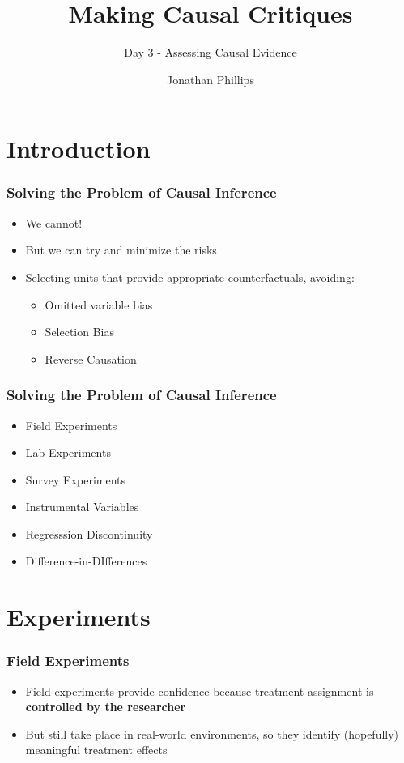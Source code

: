 \documentclass[xcolor=x11names,compress]{beamer}\usepackage[]{graphicx}\usepackage[]{color}
\title{Making Causal Critiques}
\subtitle{Day 3 - Assessing Causal Evidence}
\author{Jonathan Phillips}
\renewcommand{\(}{\begin{columns}}
\renewcommand{\)}{\end{columns}}
\newcommand{\<}[1]{\begin{column}{#1}}
\renewcommand{\>}{\end{column}}
\begin{document}
\frame{\titlepage}

\section{Introduction}

\begin{frame}
\frametitle{Solving the Problem of Causal Inference}
\begin{itemize}
\item We cannot!
\item But we can try and minimize the risks
\item Selecting units that provide appropriate counterfactuals, avoiding:
\begin{itemize}
\item Omitted variable bias
\item Selection Bias
\item Reverse Causation
\end{itemize}
\end{itemize}
\end{frame}

\begin{frame}
\frametitle{Solving the Problem of Causal Inference}
\begin{itemize}
\item Field Experiments
\item Lab Experiments
\item Survey Experiments
\item Instrumental Variables
\item Regresssion Discontinuity
\item Difference-in-DIfferences
\end{itemize}
\end{frame}

\section{Experiments}

\begin{frame} 
\frametitle{Field Experiments}
\begin{itemize}
\item Field experiments provide confidence because treatment assignment is \textbf{controlled by the researcher}
\item But still take place in real-world environments, so they identify (hopefully) meaningful treatment effects
\end{itemize}
\end{frame}
\end{document}
